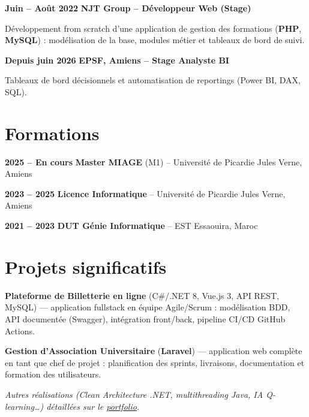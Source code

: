 \documentclass[10pt,a4paper]{article}
\newenvironment{resume_list}{\vspace{-2pt}\begin{itemize}[itemsep=0.3pt,parsep=0pt,topsep=0.3pt,leftmargin=18pt]}{\end{itemize}\vspace{-2pt}}
\newcommand{\heading}[2]{{\raggedright\noindent\textbf{#2} \quad \textbf{#1}\\}}
\begin{document}
\heading{NJT Group \textbf{--} Développeur Web (Stage)}{Juin -- Août 2022}
\begin{resume_list}
  \item Développement from scratch d'une application de gestion des formations (\textbf{PHP}, \textbf{MySQL}) : modélisation de la base, modules métier et tableaux de bord de suivi.
\end{resume_list}

\heading{EPSF, Amiens \textbf{--} Stage Analyste BI}{Depuis juin 2026}
\begin{resume_list}
  \item Tableaux de bord décisionnels et automatisation de reportings (Power BI, DAX, SQL).
\end{resume_list}

\section{Formations}
\begin{resume_list}
  \item \textbf{2025 -- En cours} \quad \textbf{Master MIAGE} (M1) -- Université de Picardie Jules Verne, Amiens
  \item \textbf{2023 -- 2025} \quad \textbf{Licence Informatique} -- Université de Picardie Jules Verne, Amiens
  \item \textbf{2021 -- 2023} \quad \textbf{DUT Génie Informatique} -- EST Essaouira, Maroc
\end{resume_list}

\section{Projets significatifs}
\begin{resume_list}
  \item \textbf{Plateforme de Billetterie en ligne} (C\#/.NET 8, Vue.js 3, API REST, MySQL) --- application fullstack en équipe Agile/Scrum : modélisation BDD, API documentée (Swagger), intégration front/back, pipeline CI/CD GitHub Actions.
  \item \textbf{Gestion d'Association Universitaire} (\textbf{Laravel}) --- application web complète en tant que chef de projet : planification des sprints, livraisons, documentation et formation des utilisateurs.
  \item \textit{Autres réalisations (Clean Architecture .NET, multithreading Java, IA Q-learning…) détaillées sur le \href{https://oualidhmoudou.github.io}{\color{accentText}\underline{portfolio}}.}
\end{resume_list}
\end{document}

